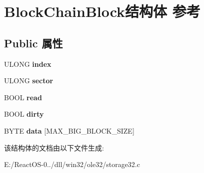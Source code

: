 \hypertarget{struct_block_chain_block}{}\section{Block\+Chain\+Block结构体 参考}
\label{struct_block_chain_block}
\subsection*{Public 属性}
\begin{DoxyCompactItemize}
\item 
\mbox{\label{struct_block_chain_block_a3cc6a9e9be8c7fab624f6075ecdde8c1}} 
U\+L\+O\+NG {\bfseries index}
\item 
\mbox{\label{struct_block_chain_block_afd846e81400f2fe6422ab3fc0c2f4f09}} 
U\+L\+O\+NG {\bfseries sector}
\item 
\mbox{\label{struct_block_chain_block_a74d3967004adb00ca9ea7a58b3c28c81}} 
B\+O\+OL {\bfseries read}
\item 
\mbox{\label{struct_block_chain_block_af1996ee20f9b80483b96cb935cfd29d5}} 
B\+O\+OL {\bfseries dirty}
\item 
\mbox{\label{struct_block_chain_block_a3f63f6e8b645dd0b0a98f0e3f8e14a2b}} 
B\+Y\+TE {\bfseries data} \mbox{[}M\+A\+X\+\_\+\+B\+I\+G\+\_\+\+B\+L\+O\+C\+K\+\_\+\+S\+I\+ZE\mbox{]}
\end{DoxyCompactItemize}


该结构体的文档由以下文件生成\+:\begin{DoxyCompactItemize}
\item 
E\+:/\+React\+O\+S-\/0../dll/win32/ole32/storage32.\+c\end{DoxyCompactItemize}
